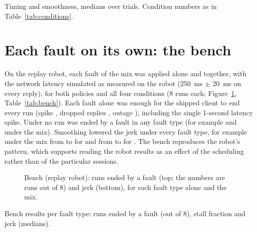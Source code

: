 \begin{table}[htbp]
  \centering
  \caption{Timing and smoothness, medians over trials. Condition numbers as in Table~\ref{tab:conditions}.}
  \label{tab:motion}
  \small
  \begin{adjustbox}{max width=\textwidth}
  \end{adjustbox}
\end{table}

\section{Each fault on its own: the bench}\label{sec:bench}

On the replay robot, each fault of the mix was applied alone and together, with the network latency simulated as
measured on the robot (250~ms $\pm$ 20~ms on every reply), for both policies and all four conditions (8 runs each;
Figure~\ref{fig:bench}, Table~\ref{tab:bench}). Each fault alone was enough for the shipped client to end every
\smolvla{} run (spike , dropped replies , outage
), including the single 1-second latency spike. Under \drtc{} no run was ended by
a fault in any fault type (for example  and  under the
mix). Smoothing lowered the jerk under every fault type, for example under the mix from 
to  for \smolvla{} and from  to
 for \groot. The bench reproduces the robot's pattern, which supports reading the robot
results as an effect of the scheduling rather than of the particular sessions.

\begin{figure}[htbp]
  \centering
  \caption{Bench (replay robot): runs ended by a fault (top; the numbers are runs out of 8) and jerk (bottom), for each
           fault type alone and the mix.}
  \label{fig:bench}
\end{figure}

\begin{table}[htbp]
  \centering
  \caption{Bench results per fault type: runs ended by a fault (out of 8), stall fraction and jerk (medians).}
  \label{tab:bench}
  \small
  \begin{adjustbox}{max width=\textwidth}
  \end{adjustbox}
\end{table}

